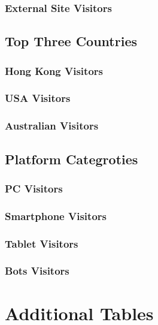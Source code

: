 \documentclass[12pt,titlepage]{article}
\begin{document}
\subsubsection{External Site Visitors}

\subsection{Top Three Countries}

\subsubsection{Hong Kong Visitors}

\subsubsection{USA Visitors}

\subsubsection{Australian Visitors}

\subsection{Platform Categroties}

\subsubsection{PC Visitors}

\subsubsection{Smartphone Visitors}

\subsubsection{Tablet Visitors}

\subsubsection{Bots Visitors}

\newpage
\appendix

\section{Additional Tables}
\end{document}
